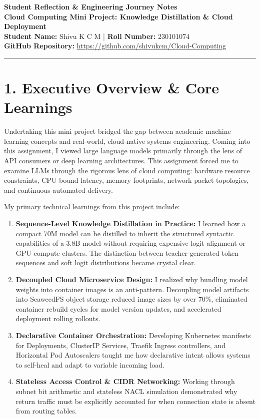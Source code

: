 \documentclass[11pt,a4paper]{article}
\begin{document}
\begin{center}
    {\LARGE \textbf{Student Reflection \& Engineering Journey Notes}}\\[0.5em]
    {\large \textbf{Cloud Computing Mini Project: Knowledge Distillation \& Cloud Deployment}}\\[0.8em]
    \textbf{Student Name:} Shivu K C M \quad | \quad \textbf{Roll Number:} 230101074\\[0.3em]
    \textbf{GitHub Repository:} \url{https://github.com/shivukcm/Cloud-Computing}
\end{center}

\vspace{1em}
\hrule
\vspace{1.5em}

\section*{1. Executive Overview \& Core Learnings}
Undertaking this mini project bridged the gap between academic machine learning concepts and real-world, cloud-native systems engineering. Coming into this assignment, I viewed large language models primarily through the lens of API consumers or deep learning architectures. This assignment forced me to examine LLMs through the rigorous lens of cloud computing: hardware resource constraints, CPU-bound latency, memory footprints, network packet topologies, and continuous automated delivery.

My primary technical learnings from this project include:
\begin{enumerate}
    \item \textbf{Sequence-Level Knowledge Distillation in Practice:} I learned how a compact 70M model can be distilled to inherit the structured syntactic capabilities of a 3.8B model without requiring expensive logit alignment or GPU compute clusters. The distinction between teacher-generated token sequences and soft logit distributions became crystal clear.
    \item \textbf{Decoupled Cloud Microservice Design:} I realized why bundling model weights into container images is an anti-pattern. Decoupling model artifacts into SeaweedFS object storage reduced image sizes by over 70\%, eliminated container rebuild cycles for model version updates, and accelerated deployment rolling rollouts.
    \item \textbf{Declarative Container Orchestration:} Developing Kubernetes manifests for Deployments, ClusterIP Services, Traefik Ingress controllers, and Horizontal Pod Autoscalers taught me how declarative intent allows systems to self-heal and adapt to variable incoming load.
    \item \textbf{Stateless Access Control \& CIDR Networking:} Working through subnet bit arithmetic and stateless NACL simulation demonstrated why return traffic must be explicitly accounted for when connection state is absent from routing tables.
\end{enumerate}
\end{document}

